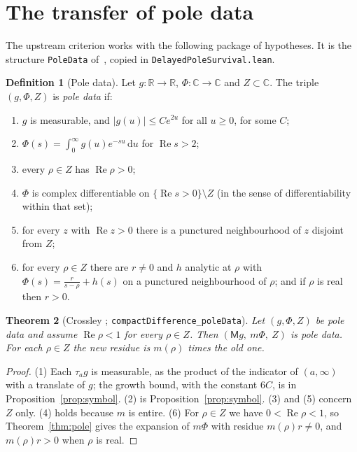 \documentclass[11pt]{amsart}
\newtheorem{theorem}{Theorem}[section]
\theoremstyle{definition}
\newtheorem{definition}[theorem]{Definition}
\theoremstyle{remark}
\DeclareMathOperator{\re}{Re}
\newcommand{\C}{\mathbb{C}}
\newcommand{\R}{\mathbb{R}}
\newcommand{\M}{\mathsf{M}}
\newcommand{\lean}[1]{\texttt{#1}}
\newcommand{\dd}{\,\mathrm{d}}
\begin{document}
\section{The transfer of pole data}\label{sec:transfer}

The upstream criterion works with the following package of hypotheses. It is the structure
\lean{PoleData} of~\cite{upstream}, copied in \lean{DelayedPoleSurvival.lean}.

\begin{definition}[Pole data]\label{def:poledata}
Let $g\colon\R\to\R$, $\Phi\colon\C\to\C$ and $Z\subset\C$. The triple $(g,\Phi,Z)$ is
\emph{pole data} if:
\begin{enumerate}
\item $g$ is measurable, and $|g(u)|\le Ce^{2u}$ for all $u\ge0$, for some $C$;
\item $\Phi(s)=\int_0^\infty g(u)e^{-su}\dd u$ for $\re s>2$;
\item every $\rho\in Z$ has $\re\rho>0$;
\item $\Phi$ is complex differentiable on $\{\re s>0\}\setminus Z$ (in the sense of
differentiability within that set);
\item for every $z$ with $\re z>0$ there is a punctured neighbourhood of $z$ disjoint from $Z$;
\item for every $\rho\in Z$ there are $r\ne0$ and $h$ analytic at $\rho$ with
$\Phi(s)=\tfrac r{s-\rho}+h(s)$ on a punctured neighbourhood of $\rho$; and if $\rho$ is real then
$r>0$.
\end{enumerate}
\end{definition}

\begin{theorem}[Crossley \cite{Crossley-transfer}; \lean{compactDifference\_poleData}]\label{thm:transfer}
Let $(g,\Phi,Z)$ be pole data and assume $\re\rho<1$ for every $\rho\in Z$. Then
$(\M g,\ m\Phi,\ Z)$ is pole data. For each $\rho\in Z$ the new residue is $m(\rho)$ times the old one.
\end{theorem}

\begin{proof}
(1) Each $\tau_ag$ is measurable, as the product of the indicator of $(a,\infty)$ with a
translate of $g$; the growth bound, with the constant $6C$, is in Proposition~\ref{prop:symbol}.
(2) is Proposition~\ref{prop:symbol}. (3) and (5) concern $Z$ only. (4) holds because $m$ is entire.
(6) For $\rho\in Z$ we have $0<\re\rho<1$, so Theorem~\ref{thm:pole} gives the expansion of
$m\Phi$ with residue $m(\rho)r\neq0$, and $m(\rho)r>0$ when $\rho$ is real.
\end{proof}
\end{document}
